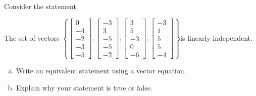 
\begin{exerciseStatement}


Consider the statement 
\begin{center}\begin{minipage}{0.8\textwidth}
 The set of vectors \( \left\{ \left[\begin{array}{c}
0 \\
-4 \\
-2 \\
-3 \\
-5
\end{array}\right] , \left[\begin{array}{c}
-3 \\
3 \\
-5 \\
-5 \\
-2
\end{array}\right] , \left[\begin{array}{c}
3 \\
5 \\
-3 \\
0 \\
-6
\end{array}\right] , \left[\begin{array}{c}
-3 \\
1 \\
5 \\
5 \\
-4
\end{array}\right] \right\} \)is linearly independent.
\end{minipage}\end{center}
    


\begin{enumerate}[(a)]
\item  Write an equivalent statement using a vector equation.
\item  Explain why your statement is true or false.
\end{enumerate}
    
\end{exerciseStatement}
    
